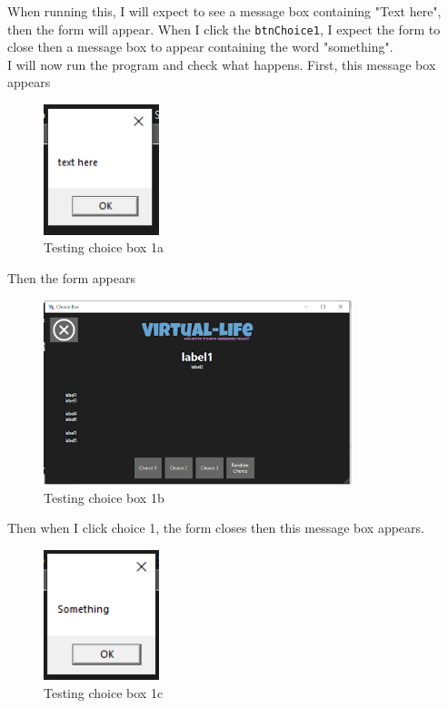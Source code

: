 When running this, I will expect to see a message box containing "Text here", then the form will appear. When I click the \verb|btnChoice1|, I expect the form to close then a message box to appear containing the word "something".\\
I will now run the program and check what happens.
\noindent First, this message box appears
\begin{figure}[H]
    \centering
    \includegraphics[width=0.3\textwidth]{images/implementation/choiceBox2a.png}
    \caption{Testing choice box 1a}
    \label{fig:implementation-choiceBox2a}
\end{figure}
\noindent Then the form appears
\begin{figure}[H]
    \centering
    \includegraphics[width=0.8\textwidth]{images/implementation/choiceBox2b.png}
    \caption{Testing choice box 1b}
    \label{fig:implementation-choiceBox2b}
\end{figure}
\noindent Then when I click choice 1, the form closes then this message box appears.
\begin{figure}[H]
    \centering
    \includegraphics[width=0.3\textwidth]{images/implementation/choiceBox2c.png}
    \caption{Testing choice box 1c}
    \label{fig:implementation-choiceBox2c}
\end{figure}
